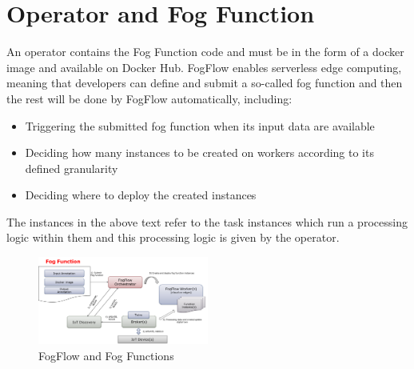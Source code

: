 \documentclass[conference]{ieeeconf}
\begin{document}
\section{Operator and Fog Function}
An operator contains the Fog Function code and must be in the form of a docker image and available on Docker Hub. 
FogFlow enables serverless edge computing, meaning that developers can define and submit a so-called fog function and then the rest will be done by FogFlow automatically, including:
\begin{itemize}
    \item Triggering the submitted fog function when its input data are available
    \item Deciding how many instances to be created on workers according to its defined granularity
    \item Deciding where to deploy the created instances
\end{itemize}{}
The instances in the above text refer to the task instances which run a processing logic within them and this processing logic is given by the operator.
\begin{figure}[ht]
    \centering
    \includegraphics[width=0.5\textwidth]{Images/function-orchestration.png}
    \caption{FogFlow and Fog Functions}
\end{figure}{}
\end{document}
